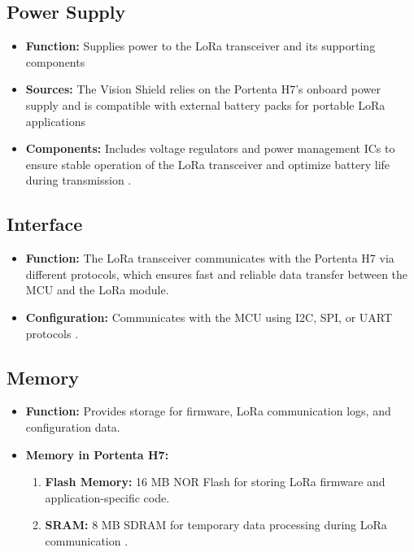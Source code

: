 \subsection{Power Supply}
\begin{itemize}
	\item \textbf{Function:} Supplies power to the LoRa transceiver and its supporting components 
	\item \textbf{Sources:} The Vision Shield relies on the Portenta H7’s onboard power supply and is compatible with external battery packs for portable LoRa applications 
	\item \textbf{Components:} Includes voltage regulators and power management ICs to ensure stable operation of the LoRa transceiver and optimize battery life during transmission \cite{ArduinoLora:2025}.
\end{itemize}

\subsection{Interface}
\begin{itemize}
	\item \textbf{Function:} The LoRa transceiver communicates with the Portenta H7 via different protocols, which ensures fast and reliable data transfer between the MCU and the LoRa module.
	\item \textbf{Configuration:} Communicates with the MCU using I2C, SPI, or UART protocols \cite{ArduinoLora:2025}.
\end{itemize}

\subsection{Memory}
\begin{itemize}
	\item \textbf{Function:} Provides storage for firmware, LoRa communication logs, and configuration data.
	\item \textbf{Memory in Portenta H7:} 
	\begin{enumerate}
		\item \textbf{Flash Memory:} 16 MB NOR Flash for storing LoRa firmware and application-specific code.
		\item \textbf{SRAM:} 8 MB SDRAM for temporary data processing during LoRa communication \cite{ArduinoLora:2025}.
	\end{enumerate}
\end{itemize}



